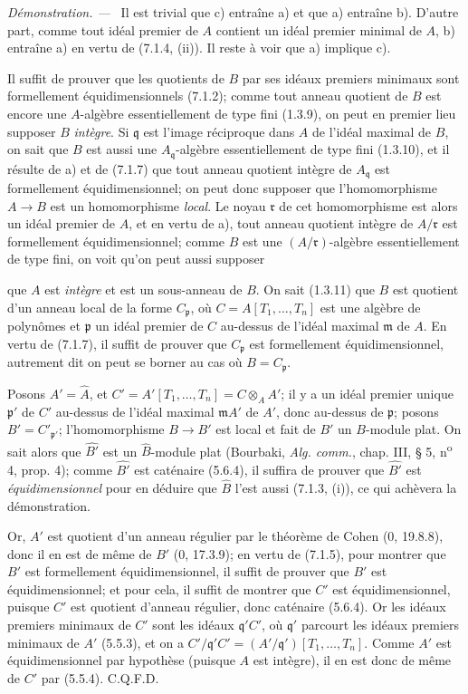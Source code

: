 \documentclass[10pt,oneside]{book}
\newcommand{\oldpage}[2][]{%
  \setcounter{footnote}{0}%
  \marginpar{\scriptsize\textbf{#1}~|~#2}\ignorespaces}
\newenvironment{proof}{%
  \par\medskip\noindent\textit{Démonstration. ---\ }}{\par}
\begin{document}
\begin{proof}
Il est trivial que c) entraîne a) et que a) entraîne b). D'autre part,
comme tout idéal premier de $A$ contient un idéal premier minimal de $A$,
b) entraîne a) en vertu de (7.1.4, (ii)). Il reste à voir que a) implique
c).

Il suffit de prouver que les quotients de $B$ par ses idéaux premiers
minimaux sont formellement équidimensionnels (7.1.2); comme tout anneau
quotient de $B$ est encore une $A$-algèbre essentiellement de type fini
(1.3.9), on peut en premier lieu supposer $B$ \emph{intègre}. Si
$\mathfrak q$ est
l'image réciproque dans $A$ de l'idéal maximal de $B$, on sait que $B$ est
aussi une $A_{\mathfrak q}$-algèbre essentiellement de type fini (1.3.10),
et il résulte de a) et de (7.1.7) que tout anneau quotient intègre de
$A_{\mathfrak q}$ est formellement équidimensionnel; on peut donc supposer
que l'homomorphisme $A\to B$ est un homomorphisme \emph{local}. Le noyau
$\mathfrak r$ de cet homomorphisme est alors un idéal premier de $A$, et en
vertu de a), tout anneau quotient intègre de $A/\mathfrak r$ est
formellement équidimensionnel; comme $B$ est une
$(A/\mathfrak r)$-algèbre essentiellement de type fini, on voit qu'on peut
aussi supposer

\oldpage[IV-2]{186}
que $A$ est \emph{intègre} et est un sous-anneau de $B$. On sait (1.3.11)
que $B$
est quotient d'un anneau local de la forme $C_{\mathfrak p}$, où
$C=A[T_1,\ldots,T_n]$ est une algèbre de polynômes et $\mathfrak p$ un
idéal premier de $C$ au-dessus de l'idéal maximal $\mathfrak m$ de $A$. En
vertu de (7.1.7), il suffit de prouver que $C_{\mathfrak p}$ est
formellement équidimensionnel, autrement dit on peut se borner au cas où
$B=C_{\mathfrak p}$.

Posons $A'=\widehat A$, et
$C'=A'[T_1,\ldots,T_n]=C\otimes_AA'$; il y a un idéal premier unique
$\mathfrak p'$ de $C'$ au-dessus de l'idéal maximal $\mathfrak mA'$ de
$A'$, donc au-dessus de $\mathfrak p$; posons $B'=C'_{\mathfrak p'}$;
l'homomorphisme $B\to B'$ est local et fait de $B'$ un $B$-module plat. On
sait alors que $\widehat {B'}$ est un $\widehat B$-module plat (Bourbaki,
\emph{Alg. comm.}, chap. III, § 5, n\textsuperscript{o} 4, prop. 4); comme
$\widehat {B'}$ est caténaire (5.6.4), il suffira de prouver que
$\widehat {B'}$ est \emph{équidimensionnel} pour en déduire que $\widehat B$ l'est
aussi (7.1.3, (i)), ce qui achèvera la démonstration.

Or, $A'$ est quotient d'un anneau régulier par le théorème de Cohen (0,
19.8.8), donc il en est de même de $B'$ (0, 17.3.9); en vertu de (7.1.5),
pour montrer que $B'$ est formellement équidimensionnel, il suffit de
prouver que $B'$ est équidimensionnel; et pour cela, il suffit de montrer
que $C'$ est équidimensionnel, puisque $C'$ est quotient d'anneau régulier,
donc caténaire (5.6.4). Or les idéaux premiers minimaux de $C'$ sont les
idéaux $\mathfrak q'C'$, où $\mathfrak q'$ parcourt les idéaux premiers
minimaux de $A'$ (5.5.3), et on a
$C'/\mathfrak q'C'=(A'/\mathfrak q')[T_1,\ldots,T_n]$. Comme $A'$ est
équidimensionnel par hypothèse (puisque $A$ est intègre), il en est donc de
même de $C'$ par (5.5.4). C.Q.F.D.
\end{proof}
\end{document}
